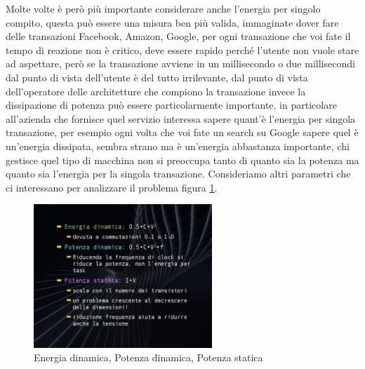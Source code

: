 Molte volte è però più importante considerare anche l'energia per singolo compito, questa può essere una misura ben più valida, immaginate  dover fare delle transazioni Facebook, Amazon, Google, per ogni transazione che voi fate il tempo di reazione non è critico, deve essere rapido perché l'utente non vuole stare ad aspettare, però se la transazione avviene in un millisecondo o due millisecondi dal punto di vista dell'utente è del tutto irrilevante, dal punto di vista dell'operatore delle architetture che compiono la transazione invece la dissipazione di potenza può essere particolarmente importante, in particolare all'azienda che fornisce quel servizio interessa sapere quant'è l'energia per singola transazione, per esempio ogni volta che voi fate un search su Google sapere quel è un'energia dissipata, sembra strano ma è un'energia abbastanza importante, chi gestisce quel tipo di macchina non si preoccupa tanto di quanto sia la potenza ma quanto sia l'energia per la singola transazione.
Consideriamo altri parametri che ci interessano per analizzare il problema figura \ref{fig:Lez02_p01_fig_06}.

\begin{figure}[H]
  \centering
  \includegraphics[width=0.6\textwidth,
                    trim=50 50 45 40, %
                    clip]{images/Lez02_p01_fig_06.png}
  \caption{Energia dinamica, Potenza dinamica, Potenza statica}
  \label{fig:Lez02_p01_fig_06}
\end{figure}


